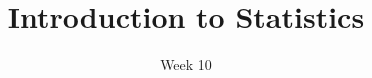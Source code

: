 \title{Introduction to Statistics}
\date{Week 10}





\thispagestyle{plain}
\graphicspath{{lectures/week09/}}




